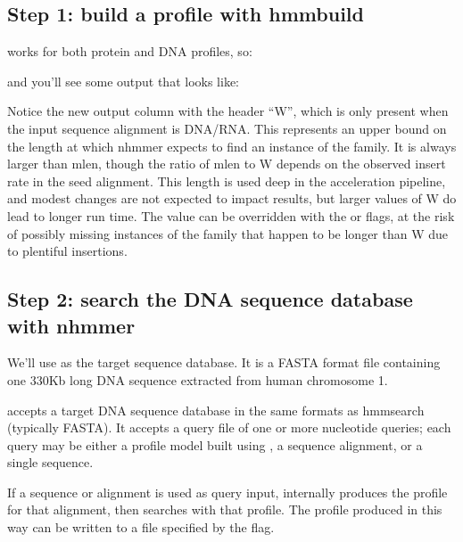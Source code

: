 \subsection{Step 1: build a profile with hmmbuild}

 works for both protein and DNA profiles, so:

   \vspace{1ex}
   \vspace{1ex}

and you'll see some output that looks like:



Notice the new output column with the header ``W'', which is only
present when the input sequence alignment is DNA/RNA. This represents
an upper bound on the length at which nhmmer expects to find an
instance of the family.  It is always larger than mlen,
though the ratio of mlen to W depends on the observed insert rate in
the seed alignment. This length is used deep in the acceleration
pipeline, and modest changes are not expected to impact results, but
larger values of W do lead to longer run time. The value can be
overridden with the  or  flags, at
the risk of possibly missing instances of the family that happen to be
longer than W due to plentiful insertions.



\subsection{Step 2: search the DNA sequence database with nhmmer}

We'll use  as the target sequence
database. It is a FASTA format file containing one 330Kb long DNA
sequence extracted from human chromosome 1.

 accepts a target DNA sequence database in the same
formats as hmmsearch (typically FASTA). It accepts a query file
of one or more nucleotide queries; each
query may be either a profile model built using
,
a sequence alignment, or a single sequence.

If a sequence or alignment is used as query input, 
internally produces the profile for that alignment, then searches with that
profile. The profile produced in this way can be written to a file
specified by the  flag.

